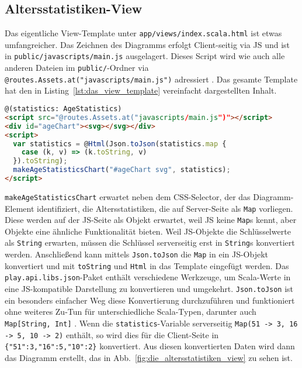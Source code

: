 
\subsection{Altersstatistiken-View} %
\label{sub:altersstatistiken_view}

Das eigentliche View-Template unter \lstinline|app/views/index.scala.html| ist etwas umfangreicher.
Das Zeichnen des Diagramms erfolgt Client-seitig via JS und ist in \lstinline|public/javascripts/main.js| ausgelagert.
Dieses Script wird wie auch alle anderen Dateien im \lstinline|public/|-Ordner via \lstinline|@routes.Assets.at("javascripts/main.js")| adressiert \cite[vgl.][S.~111]{play_for_scala}.
Das gesamte Template hat den in Listing~\ref{lst:das_view_template} vereinfacht dargestellten Inhalt.

\begin{lstlisting}[language=html,caption=Das View-Template, label=lst:das_view_template]
@(statistics: AgeStatistics)
<script src="@routes.Assets.at("javascripts/main.js")"></script>
<div id="ageChart"><svg></svg></div>
<script>
  var statistics = @Html(Json.toJson(statistics.map {
    case (k, v) => (k.toString, v)
  }).toString);
  makeAgeStatisticsChart("#ageChart svg", statistics);
</script>
\end{lstlisting}

\lstinline|makeAgeStatisticsChart| erwartet neben dem CSS-Selector, der das Diagramm-Element identifiziert, die Altersstatistiken, die auf Server-Seite als \lstinline|Map| vorliegen.
Diese werden auf der JS-Seite als Objekt erwartet, weil JS keine \lstinline|Map|s kennt, aber Objekte eine ähnliche Funktionalität bieten.
Weil JS-Objekte die Schlüsselwerte als \lstinline|String| erwarten, müssen die Schlüssel serverseitig erst in \lstinline|String|s konvertiert werden.
Anschließend kann mittels \lstinline|Json.toJson| die \lstinline|Map| in ein JS-Objekt konvertiert und mit \lstinline|toString| und \lstinline|Html| in das Template eingefügt werden.
Das \lstinline|play.api.libs.json|-Paket enthält verschiedene Werkzeuge, um Scala-Werte in eine JS-kompatible Darstellung zu konvertieren und umgekehrt.
\lstinline|Json.toJson| ist ein besonders einfacher Weg diese Konvertierung durchzuführen und funktioniert ohne weiteres Zu-Tun für unterschiedliche Scala-Typen, darunter auch \lstinline|Map[String, Int]| \cite[vgl.][S.~214--215]{play_for_scala}.
Wenn die \lstinline|statistics|-Variable serverseitig \lstinline|Map(51 -> 3, 16 -> 5, 10 -> 2)| enthält, so wird dies für die Client-Seite in \lstinline|{"51":3,"16":5,"10":2}| konvertiert.
Aus diesen konvertierten Daten wird dann das Diagramm erstellt, das in Abb.~\ref{fig:die_altersstatistiken_view} zu sehen ist.

